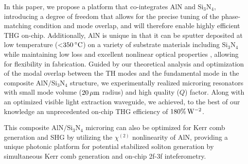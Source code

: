 \documentclass[9pt,twocolumn,twoside]{optica}
\begin{document}
In this paper, we propose a platform that co-integrates $\mathrm{AlN}$ and $\mathrm{Si_3N_4}$, introducing a degree of freedom that allows for the precise tuning of the phase-matching condition and mode overlap, and will therefore enable highly efficient THG on-chip. Additionally, $\mathrm{AlN}$ is unique in that it can be sputter deposited at low temperature (<$350\thinspace{}^{\circ}\mathrm{C}$) on a variety of substrate materials including $\mathrm{Si_{3}N_{4}}$ while maintaining low loss and excellent nonlinear optical properties \cite{Pernice:12, Xiong:12, Pernice2:12}, allowing for flexibility in fabrication. Guided by our theoretical analysis and optimization of the modal overlap between the TH modes and the fundamental mode in the composite $\mathrm{AlN/Si_{3}N_{4}}$ structure, we experimentally realized microring resonators with small mode volume ($20\thinspace\mu\mathrm{m}$ radius) and high quality ($Q$) factor. Along with an optimized visible light extraction waveguide, we achieved, to the best of our knowledge an unprecedented on-chip THG efficiency of $180\%\thinspace\mathrm{W^{-2}}$.

This composite $\mathrm{AlN/Si_3N_4}$ microring can also be optimized for Kerr comb generation and SHG by utilizing the $\chi^{(2)}$ nonlinearity of AlN, providing a unique photonic platform for potential stabilized soliton generation by simultaneous Kerr comb generation and on-chip 2f-3f inteferometry. %
\end{document}
